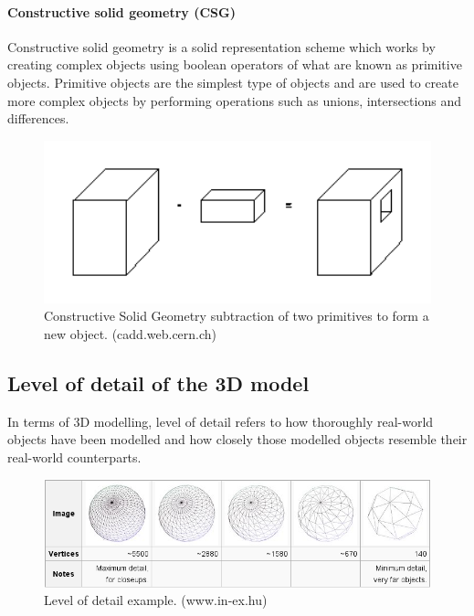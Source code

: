 \documentclass[11pt,a4paper]{report}
\begin{document}
				\paragraph{Constructive solid geometry (CSG)}
					Constructive solid geometry is a solid representation scheme which works by creating complex objects using boolean operators of what are known as primitive objects. Primitive objects are the simplest type of objects and are used to create more complex objects by performing operations such as unions, intersections and differences.
					\cite{foley_computer_1996}
					\begin{figure}[H]
						\centering
						\includegraphics[width=1\textwidth]{csg}
						\caption[Constructive Solid Geometry]{Constructive Solid Geometry subtraction of two primitives to form a new object. (cadd.web.cern.ch)}
					\end{figure}
				
		\subsection{Level of detail of the 3D model}
			In terms of 3D modelling, level of detail refers to how thoroughly real-world objects have been modelled and how closely those modelled objects resemble their real-world counterparts.
			
			\begin{figure}[H]
				\centering
				\includegraphics[width=1\textwidth]{level_of_detail_example}
				\caption[Level of detail]{Level of detail example. (www.in-ex.hu)}
				\label{fig:lod}
			\end{figure}
			
\end{document}
